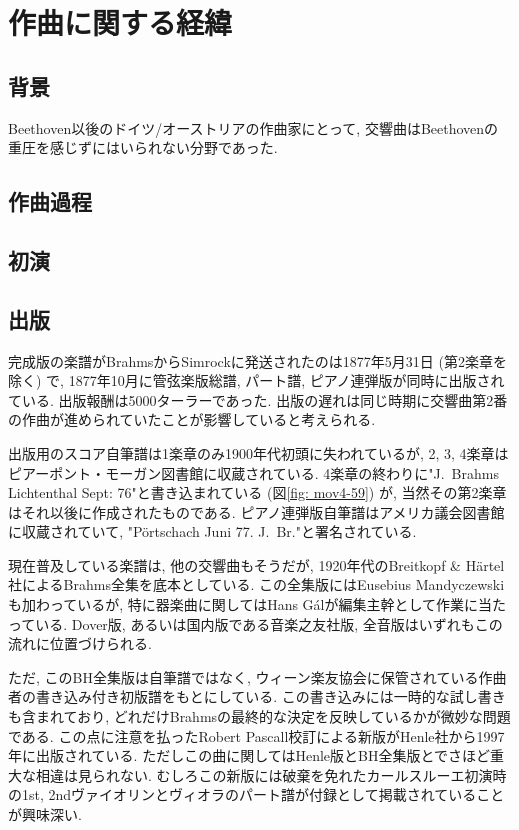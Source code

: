 
\chapter{作曲に関する経緯}

\section{背景}

Beethoven以後のドイツ/オーストリアの作曲家にとって, 交響曲はBeethovenの重圧を感じずにはいられない分野であった.




\section{作曲過程}\label{sec: process}

\section{初演}

\section{出版}

完成版の楽譜がBrahmsからSimrockに発送されたのは1877年5月31日 (第2楽章を除く) で\cite{library},
1877年10月に管弦楽版総譜, パート譜, ピアノ連弾版が同時に出版されている\cite{frisch}. 出版報酬は5000ターラーであった\cite{henle}.
出版の遅れは同じ時期に交響曲第2番の作曲が進められていたことが影響していると考えられる.

出版用のスコア自筆譜は1楽章のみ1900年代初頭に失われているが, 2, 3, 4楽章はピアーポント・モーガン図書館に収蔵されている.
4楽章の終わりに"J.~Brahms Lichtenthal Sept: 76"と書き込まれている (図\ref{fig: mov4-59}) が, 当然その第2楽章はそれ以後に作成されたものである.
ピアノ連弾版自筆譜はアメリカ議会図書館に収蔵されていて, "Pörtschach Juni 77. J.~Br."と署名されている\cite{frisch}.

現在普及している楽譜は, 他の交響曲もそうだが, 1920年代のBreitkopf \& Härtel社によるBrahms全集を底本としている.
この全集版にはEusebius Mandyczewskiも加わっているが, 特に器楽曲に関してはHans Gálが編集主幹として作業に当たっている.
Dover版, あるいは国内版である音楽之友社版\cite{ogt}, 全音版はいずれもこの流れに位置づけられる.

ただ, このBH全集版は自筆譜ではなく, ウィーン楽友協会に保管されている作曲者の書き込み付き初版譜をもとにしている.
この書き込みには一時的な試し書きも含まれており, どれだけBrahmsの最終的な決定を反映しているかが微妙な問題である.
この点に注意を払ったRobert Pascall校訂による新版がHenle社から1997年に出版されている\cite{henle}.
ただしこの曲に関してはHenle版とBH全集版とでさほど重大な相違は見られない.
むしろこの新版には破棄を免れたカールスルーエ初演時の1st, 2ndヴァイオリンとヴィオラのパート譜が付録として掲載されていることが興味深い.

